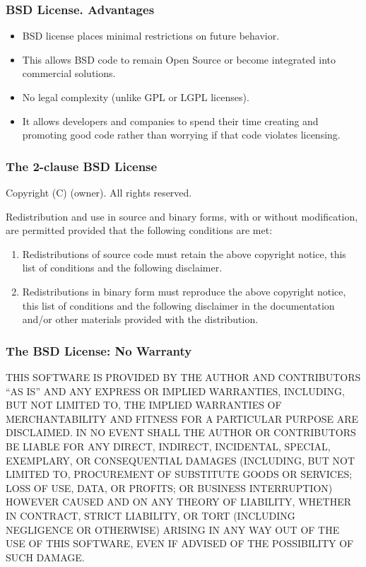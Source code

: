
\begin{frame}
\frametitle{BSD License. Advantages}

\begin{itemize}
\item BSD license places minimal restrictions on future behavior.
\item This allows BSD code to remain Open Source or become integrated into commercial solutions.
\item No legal complexity (unlike GPL or LGPL licenses). 
\item It allows developers and companies to spend their time creating and promoting good code rather than worrying if that code violates licensing.
\end{itemize}

\end{frame}



\begin{frame}
\frametitle{The 2-clause BSD License}

Copyright (C) (owner). All rights reserved.

Redistribution and use in source and binary forms, with or without
modification, are permitted provided that the following conditions
are met:

\begin{enumerate}
\item Redistributions of source code must retain the above copyright notice, this list of  conditions and the following disclaimer.
\item Redistributions in binary form must reproduce the above copyright notice, this list of conditions and the following disclaimer in the documentation and/or other materials provided with the distribution.
\end{enumerate}
 
\end{frame}


\begin{frame}
\frametitle{The BSD License: No Warranty}

{\small
THIS SOFTWARE IS PROVIDED BY THE AUTHOR AND CONTRIBUTORS ``AS IS'' 
AND ANY EXPRESS OR IMPLIED WARRANTIES, INCLUDING, BUT NOT LIMITED TO, 
THE IMPLIED WARRANTIES OF MERCHANTABILITY AND FITNESS FOR A PARTICULAR 
PURPOSE ARE DISCLAIMED. IN NO EVENT SHALL THE AUTHOR OR CONTRIBUTORS 
BE LIABLE FOR ANY DIRECT, INDIRECT, INCIDENTAL, SPECIAL, EXEMPLARY, 
OR CONSEQUENTIAL DAMAGES (INCLUDING, BUT NOT LIMITED TO, PROCUREMENT 
OF SUBSTITUTE GOODS OR SERVICES; LOSS OF USE, DATA, OR PROFITS; 
OR BUSINESS INTERRUPTION) HOWEVER CAUSED AND ON ANY THEORY OF LIABILITY, 
WHETHER IN CONTRACT, STRICT LIABILITY, OR TORT (INCLUDING NEGLIGENCE 
OR OTHERWISE) ARISING IN ANY WAY OUT OF THE USE OF THIS SOFTWARE, 
EVEN IF ADVISED OF THE POSSIBILITY OF SUCH DAMAGE.
}

\end{frame}

